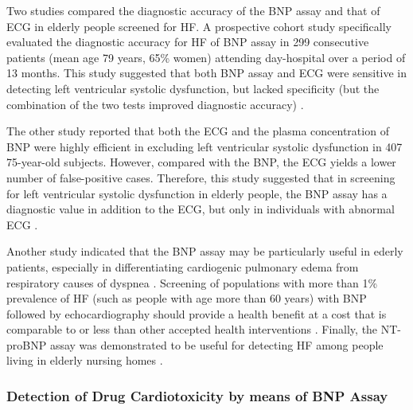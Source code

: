\documentclass[14pt,a4paper,onecolumn]{extarticle}
\begin{document}
Two studies compared the diagnostic accuracy of the BNP assay and that of ECG in elderly people screened for HF. A prospective cohort study specifically evaluated the diagnostic accuracy for HF of BNP assay in 299 consecutive patients (mean age 79 years, 65\% women) attending day-hospital over a period of 13 months. This study suggested that both BNP assay and ECG were sensitive in detecting left ventricular systolic dysfunction, but lacked specificity (but the combination of the two tests improved diagnostic accuracy) \citep{bib3143}.

The other study reported that both the ECG and the plasma concentration of BNP were highly efficient in excluding left ventricular systolic dysfunction in 407 75-year-old subjects. However, compared with the BNP, the ECG yields a lower number of false-positive cases. Therefore, this study suggested that in screening for left ventricular systolic dysfunction in elderly people, the BNP assay has a diagnostic value in addition to the ECG, but only in individuals with abnormal ECG \citep{bib3144}.

Another study indicated that the BNP assay may be particularly useful in ederly patients, especially in differentiating cardiogenic pulmonary edema from respiratory causes of dyspnea \citep{bib3146}. Screening of populations with more than 1\% prevalence of HF (such as people with age more than 60 years) with BNP followed by echocardiography should provide a health benefit at a cost that is comparable to or less than other accepted health interventions \citep{bib3145}. Finally, the NT-proBNP assay was demonstrated to be useful for detecting HF among people living in elderly nursing homes \citep{bib3147}.


\subsubsection{ Detection of Drug Cardiotoxicity by means of BNP Assay}
\end{document}
